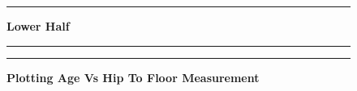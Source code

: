 \documentclass[]{article}
\begin{document}
\begin{figure}[!ht]
    \hrule
    \caption{ \textbf{Lower Half} }
    \begin{center}
    \end{center}
    \label{fig:hip-floor-graph}
  \hrule
  \vspace{2.5mm}
      \caption{\textbf{ Plotting Age Vs Hip To Floor Measurement }   }
      \label{fig:combined}
  \vspace{-2.5mm}
  \hrule
\end{figure}
\newpage
\end{document}
